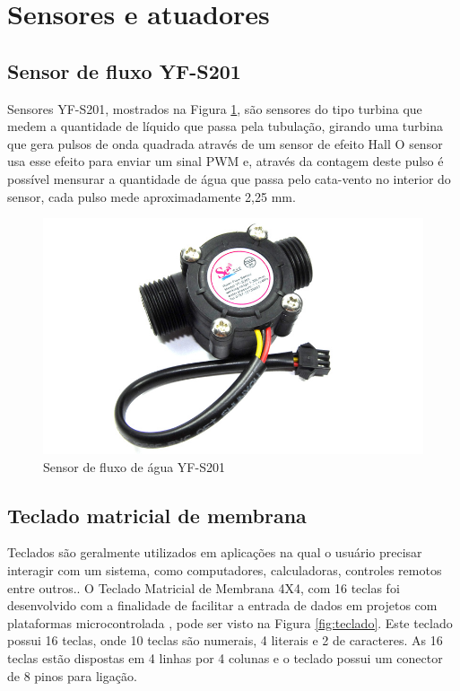 \section{Sensores e atuadores}

\subsection{Sensor de fluxo YF-S201}

Sensores YF-S201, mostrados na Figura \ref{fig:sensor}, são sensores do tipo turbina que medem a quantidade de líquido que passa pela tubulação, girando uma turbina que
gera pulsos de onda quadrada através de um sensor de efeito Hall \cite{roque2018sistema} O
sensor usa esse efeito para enviar um sinal PWM e, através da contagem deste pulso é possível mensurar a quantidade de água que passa pelo cata-vento no interior do sensor, cada pulso mede aproximadamente 2,25 mm.\cite{ms2017automaccao}

\begin{figure}[htbp]
		\centering
		\includegraphics[scale=0.3]{figuras/yf-s201.jpg}
		\caption{Sensor de fluxo de água YF-S201}
		\label{fig:sensor}
\end{figure}

\subsection{Teclado matricial de membrana}

Teclados são geralmente utilizados em aplicações na qual o usuário precisar interagir com um sistema, como computadores, calculadoras, controles remotos entre outros.\cite{teclado-matricial-1}. O Teclado Matricial de Membrana 4X4, com 16 teclas foi desenvolvido com a finalidade de facilitar a entrada de dados em projetos com plataformas microcontrolada \cite{teclado-matricial}, pode ser visto na Figura \ref{fig:teclado}. Este teclado possui 16 teclas, onde 10 teclas são numerais, 4 literais e 2 de caracteres. As 16 teclas estão dispostas em 4 linhas por 4 colunas e o teclado possui um conector de 8 pinos para ligação.

